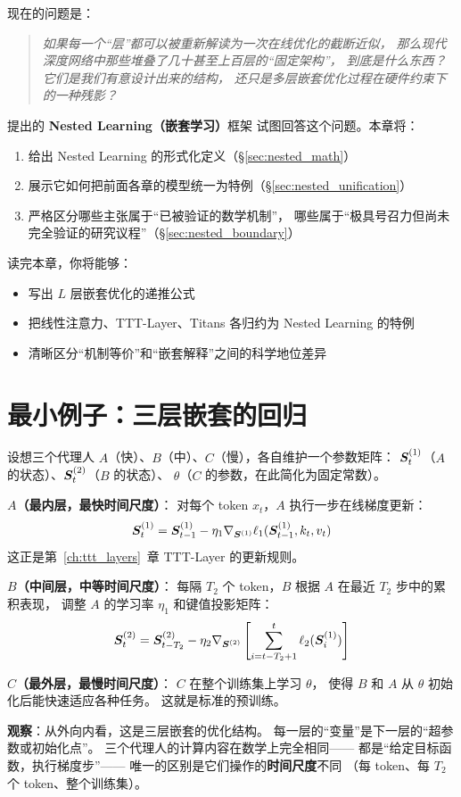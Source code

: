 现在的问题是：

\begin{quote}
\textit{如果每一个``层''都可以被重新解读为一次在线优化的截断近似，
那么现代深度网络中那些堆叠了几十甚至上百层的``固定架构''，
到底是什么东西？它们是我们有意设计出来的结构，
还只是多层嵌套优化过程在硬件约束下的一种残影？}
\end{quote}

\citet{anonymous2025nested} 提出的 \textbf{Nested Learning（嵌套学习）}框架
试图回答这个问题。本章将：
\begin{enumerate}
  \item 给出 Nested Learning 的形式化定义（\S\ref{sec:nested_math}）
  \item 展示它如何把前面各章的模型统一为特例（\S\ref{sec:nested_unification}）
  \item 严格区分哪些主张属于``已被验证的数学机制''，
        哪些属于``极具号召力但尚未完全验证的研究议程''（\S\ref{sec:nested_boundary}）
\end{enumerate}

读完本章，你将能够：
\begin{itemize}
  \item 写出 $L$ 层嵌套优化的递推公式
  \item 把线性注意力、TTT-Layer、Titans 各归约为 Nested Learning 的特例
  \item 清晰区分``机制等价''和``嵌套解释''之间的科学地位差异
\end{itemize}

\section{最小例子：三层嵌套的回归}
\label{sec:nested_minimal}

\begin{toybox}[title=玩具问题 G：三层嵌套的在线回归代理人]
设想三个代理人 $A$（快）、$B$（中）、$C$（慢），各自维护一个参数矩阵：
$\boldsymbol{S}^{(1)}_t$（$A$ 的状态）、$\boldsymbol{S}^{(2)}_t$（$B$ 的状态）、
$\theta$（$C$ 的参数，在此简化为固定常数）。

\textbf{$A$（最内层，最快时间尺度）}：
对每个 token $x_t$，$A$ 执行一步在线梯度更新：
\[
  \boldsymbol{S}^{(1)}_t = \boldsymbol{S}^{(1)}_{t-1} - \eta_1 \nabla_{\boldsymbol{S}^{(1)}} \ell_1(\boldsymbol{S}^{(1)}_{t-1}, k_t, v_t)
\]
这正是第~\ref{ch:ttt_layers}~章 TTT-Layer 的更新规则。

\textbf{$B$（中间层，中等时间尺度）}：
每隔 $T_2$ 个 token，$B$ 根据 $A$ 在最近 $T_2$ 步中的累积表现，
调整 $A$ 的学习率 $\eta_1$ 和键值投影矩阵：
\[
  \boldsymbol{S}^{(2)}_t = \boldsymbol{S}^{(2)}_{t-T_2}
  - \eta_2 \nabla_{\boldsymbol{S}^{(2)}} \left[\sum_{i=t-T_2+1}^{t} \ell_2(\boldsymbol{S}^{(1)}_i)\right]
\]

\textbf{$C$（最外层，最慢时间尺度）}：
$C$ 在整个训练集上学习 $\theta$，
使得 $B$ 和 $A$ 从 $\theta$ 初始化后能快速适应各种任务。
这就是标准的预训练。

\textbf{观察}：从外向内看，这是三层嵌套的优化结构。
每一层的``变量''是下一层的``超参数或初始化点''。
三个代理人的计算内容在数学上完全相同——
都是``给定目标函数，执行梯度步''——
唯一的区别是它们操作的\textbf{时间尺度}不同
（每 token、每 $T_2$ 个 token、整个训练集）。
\end{toybox}

